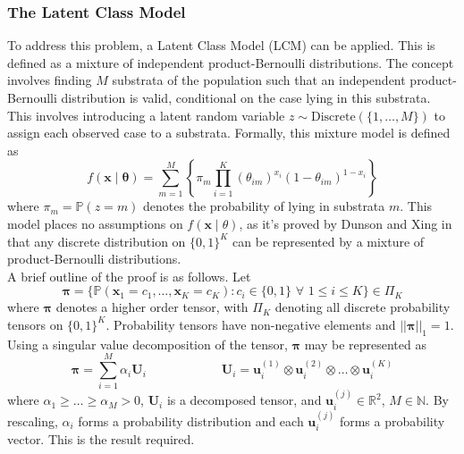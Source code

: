 \documentclass[10pt,a4paper,notitlepage]{article}
\newcommand{\abs}[1]{\lvert#1\rvert}
\newcommand{\N}{\mathbb{N}}
\newcommand{\R}{\mathbb{R}}
\newcommand{\Prob}{\mathbb{P}}
\newcommand{\x}{\textbf{x}}
\begin{document}
\subsubsection*{The Latent Class Model}
To address this problem, a Latent Class Model (LCM) can be applied. This is defined as a mixture of independent product-Bernoulli distributions. The concept involves finding $M$ substrata of the population such that an independent product-Bernoulli distribution is valid, conditional on the case lying in this substrata. This involves introducing a latent random variable $z\sim\text{Discrete}(\{1,\hdots,M\})$ to assign each observed case to a substrata.
Formally, this mixture model is defined as
\begin{equation}
f(\x\mid\bm{\theta})=\sum_{m=1}^{M}\left\lbrace\pi_{m}\prod_{i=1}^{K}(\theta_{im})^{x_{i}}(1-\theta_{im})^{1-x_{i}}\right\rbrace
\end{equation}
where $\pi_{m}=\Prob(z=m)$ denotes the probability of lying in substrata $m$. This model places no assumptions on $f(\x\mid\theta)$, as it's proved by Dunson and Xing in \cite{BinomialMixingGood} that any discrete distribution on $\{0,1\}^{K}$ can be represented by a mixture of product-Bernoulli distributions. \\

A brief outline of the proof is as follows. Let 
\begin{equation}
\bm{\pi}=\{\Prob(\x_{1}=c_{1},\hdots,\x_{K}=c_{K}) : c_{i}\in\{0,1\} \,\, \forall \,\,1\leq i\leq K\}\in\Pi_{K}
\end{equation}
where $\bm{\pi}$ denotes a higher order tensor, with $\Pi_{K}$ denoting all discrete probability tensors on $\{0,1\}^{K}$. Probability tensors have non-negative elements and $\abs{\abs{\bm{\pi}}}_{1}=1$. Using a singular value decomposition of the tensor, $\bm{\pi}$ may be represented as
\begin{equation}
\bm{\pi}=\sum_{i=1}^{M}\alpha_{i}\mathbf{U}_{i} \quad \quad\quad\quad\quad\quad \mathbf{U}_{i}=\mathbf{u}_{i}^{(1)}\otimes\mathbf{u}_{i}^{(2)}\otimes\hdots\otimes\mathbf{u}_{i}^{(K)}
\end{equation}
where $\alpha_{1}\geq\hdots\geq\alpha_{M}>0$, $\mathbf{U}_{i}$ is a decomposed tensor, and $\mathbf{u}_{i}^{(j)}\in\R^{2}$, $M\in\N$. By rescaling, $\alpha_{i}$ forms a probability distribution and each $\mathbf{u}_{i}^{(j)}$ forms a probability vector. This is the result required.
\end{document}
